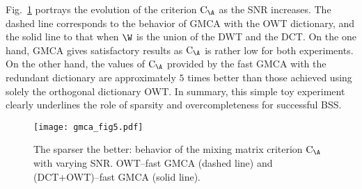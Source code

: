 Fig.\ \ref{fig:bgmca_tstb} portrays the evolution of the criterion $\mathrm{C}_{\A}$ as the SNR increases. The dashed line corresponds to the behavior of GMCA with the OWT dictionary, and the solid line to that when $\W$ is the union of the DWT and the DCT. On the one hand, GMCA gives satisfactory results as $\mathrm{C}_{\A}$ is rather low for both experiments. On the other hand, the values of $\mathrm{C}_{\A}$ provided by the fast GMCA with the redundant dictionary are approximately $5$ times better than those achieved using solely the orthogonal dictionary OWT. In summary, this simple toy experiment clearly underlines the role of sparsity and overcompleteness for successful BSS.

\begin{figure}[htb]
\begin{minipage}[b]{1\linewidth}
             \centerline{         \texttt{[image: gmca\_fig5.pdf]}}

\end{minipage}
\caption{The sparser the better: behavior of the mixing matrix criterion $\mathrm{C}_{\A}$ with varying SNR. OWT--fast GMCA (dashed line) and (DCT+OWT)--fast GMCA (solid line).} 
\label{fig:bgmca_tstb}
\end{figure}





